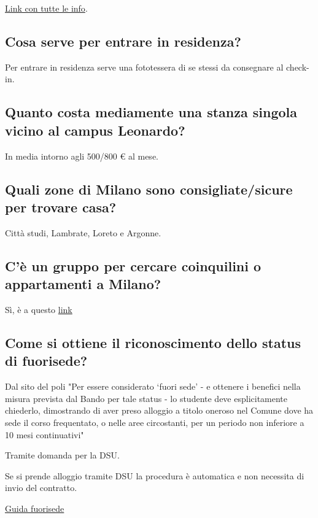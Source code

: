 \documentclass[legal]{polinetwork}
\begin{document}
\href{https://www.residenze.polimi.it}{Link con tutte le info}.

\subsection{Cosa serve per entrare in residenza?}


Per entrare in residenza serve una fototessera di se stessi da consegnare al check-in.

\subsection{Quanto costa mediamente una stanza singola vicino al campus Leonardo?}


In media intorno agli 500/800 € al mese.

\subsection{Quali zone di Milano sono consigliate/sicure per trovare casa?}


Città studi, Lambrate, Loreto e Argonne.

\subsection{C'è un gruppo per cercare coinquilini o appartamenti a Milano?}


Sì, è a questo \href{https://t.me/joinchat/jmpNOitFNFw1MzJk}{link}

\subsection{Come si ottiene il riconoscimento dello status di fuorisede?}


Dal sito del poli "Per essere considerato ‘fuori sede’ - e ottenere i benefici nella misura prevista dal Bando per tale status - lo studente deve esplicitamente chiederlo, dimostrando di aver preso alloggio a titolo oneroso nel Comune dove ha sede il corso frequentato, o nelle aree circostanti, per un periodo non inferiore a 10 mesi continuativi"

Tramite domanda per la DSU.

Se si prende alloggio tramite DSU la procedura è automatica e non necessita di invio del contratto.

\href{https://www.polimi.it/studenti/tasse-borse-e-agevolazioni/diritto-allo-studio}{Guida fuorisede}
\end{document}

